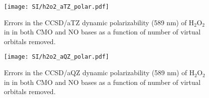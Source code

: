 \begin{figure}
  \centering
  \texttt{[image: SI/h2o2\_aTZ\_polar.pdf]}
  \caption{{\footnotesize Errors in the CCSD/aTZ dynamic polarizability (589 nm) of
H$_2$O$_2$ in in both CMO and NO bases as a function of number of virtual orbitals removed.}
   \label{fig:h2o2_aTZ_polar}}
\end{figure}
\begin{figure}
  \centering
  \texttt{[image: SI/h2o2\_aQZ\_polar.pdf]}
  \caption{{\footnotesize Errors in the CCSD/aQZ dynamic polarizability (589 nm) of
H$_2$O$_2$ in in both CMO and NO bases as a function of number of virtual orbitals removed.}}
   \label{fig:h2o2_aQZ_polar}
\end{figure}
